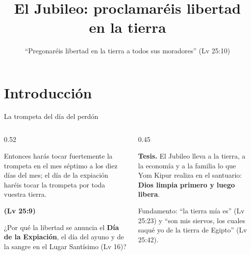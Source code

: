 \documentclass[hyperref={bookmarks=false},aspectratio=169]{beamer}
\title[El Jubileo]{\bfseries{El Jubileo: proclamaréis libertad en la tierra}}
\subtitle{``Pregonaréis libertad en la tierra a todos sus moradores'' (Lv 25:10)}
\author{}\institute{}\date{}
\newcommand{\fuente}[1]{\par\hfill{\upshape\bfseries\footnotesize\textcolor{tierraroja}{#1}}}
\newcommand{\destacar}[1]{\textbf{\textcolor{tierraroja}{#1}}}
\begin{document}
\frame{\titlepage}


\section{Introducción}

\begin{frame}{La trompeta del día del perdón}
\begin{columns}[c,onlytextwidth]
\begin{column}{0.52\textwidth}
\begin{cita}Entonces harás tocar fuertemente la trompeta en el mes séptimo a los diez días del mes; el día de la expiación haréis tocar la trompeta por toda vuestra tierra.\fuente{(Lv 25:9)}\end{cita}
\small ¿Por qué la libertad se anuncia el \destacar{Día de la Expiación}, el día del ayuno y de la sangre en el Lugar Santísimo (Lv 16)?
\end{column}
\begin{column}{0.45\textwidth}
\begin{tcolorbox}[colback=papiro,colframe=tierraroja,boxrule=1pt,arc=3pt,left=4pt,right=4pt]
\small\textbf{Tesis.} El Jubileo lleva a la tierra, a la economía y a la familia lo que Yom Kipur realiza en el santuario: \destacar{Dios limpia primero y luego libera}.
\end{tcolorbox}
\scriptsize Fundamento: ``la tierra mía es'' (Lv 25:23) y ``son mis siervos, los cuales saqué yo de la tierra de Egipto'' (Lv 25:42).
\end{column}
\end{columns}
\end{frame}
\end{document}
